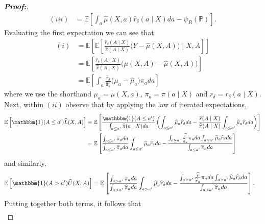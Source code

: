 \documentclass[11pt,twoside]{article}
\theoremstyle{definition}
\theoremstyle{remark}
\begin{document}
\begin{proof}[\textbf{Proof:}]
\begin{align*}
    (iii) &= \mathbb{E}\left[\int_a \widehat{\mu}(X, a) \widehat{r}_\delta(a \mid X)da  - \psi_R(\mathbb{P}) \right].
\end{align*}
Evaluating the first expectation we can see that
\begin{align*}
    (i) &= \mathbb{E}\left[ \mathbb{E}\left[\frac{\widehat{r}_\delta(A \mid X)}{\widehat{\pi}(A \mid X)} \Big(Y - \widehat{\mu}(X, A) \Big) \mid X, A \right] \right] \\
    &= \mathbb{E}\left[\frac{\widehat{r}_\delta(A \mid X)}{\widehat{\pi}(A \mid X)} \Big(\mu(X, A) - \widehat{\mu}(X, A) \Big) \right] \\
    &= \mathbb{E}\left[\int_a \frac{\widehat{r}_\delta}{\widehat{\pi}_a} \Big(\mu_a - \widehat{\mu}_a \Big) \pi_a da\right]
\end{align*}
where we use the shorthand $\mu_a = \mu(X, a)$, $\pi_a = \pi(a \mid X)$ and $r_\delta = r_\delta(a \mid X)$. Next, within $(ii)$ observe that by applying the law of iterated expectations,
\begin{align*}
    \mathbb{E}\left[\mathbbm{1}(A \leq a^{\prime}) \widehat{L}(X, A) \right] &= \mathbb{E}\left[ \frac{\mathbbm{1}(A \leq a^{\prime}) }{\int_{a \leq a^{\prime}}  \widehat{\pi}(a \mid X) da} \left( \int_{a \leq a^{\prime}}  \widehat{\mu}_a \widehat{r}_\delta da - \frac{\widehat{r}(A \mid X)}{\widehat{\pi}(A \mid X)} \int_{a \leq a^{\prime}} \widehat{\mu}_a \widehat{r}_\delta da \right) \right] \\
    &=  \mathbb{E}\left[ \frac{\int_{a \leq a^{\prime}}  \pi_a da}{\int_{a \leq a^{\prime}}  \widehat{\pi}_a da}  \int_{a \leq a^{\prime}}  \widehat{\mu}_a \widehat{r}_\delta da - \frac{\int_{a \leq a^{\prime}} \frac{\widehat{r}  }{\widehat{\pi}_a} \pi_a da \int_{a \leq a^{\prime}} \widehat{\mu}_a \widehat{r}_\delta da}{\int_{a \leq a^{\prime}}  \widehat{\pi}_a da} \right] 
\end{align*}
and similarly,
\begin{align*}
     \mathbb{E}\left[\mathbbm{1}(A > a^{\prime}) \widehat{U}(X, A) \right] &= \mathbb{E}\left[ \frac{\int_{a > a^{\prime}}  \pi_a da}{\int_{a > a^{\prime}}  \widehat{\pi}_a da}  \int_{a > a^{\prime}}  \widehat{\mu}_a \widehat{r}_\delta da - \frac{\int_{a > a^{\prime}} \frac{\widehat{r}  }{\widehat{\pi}_a} \pi_a da \int_{a > a^{\prime}} \widehat{\mu}_a \widehat{r}_\delta da}{\int_{a > a^{\prime}}  \widehat{\pi}_a da} \right] .
\end{align*}
Putting together both terms, it follows that
\begin{align*}

\end{align*}
\end{proof}
\end{document}
